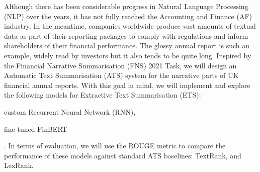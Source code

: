 Although there has been considerable progress in Natural Language Processing (NLP) over the years, it has not fully reached the Accounting and Finance (AF) industry.
In the meantime, companies worldwide produce vast amounts of textual data as part of their reporting packages to comply with regulations and inform shareholders of their financial performance.
The glossy annual report is such an example, widely read by investors but it also tends to be quite long.
Inspired by the Financial Narrative Summarisation (FNS) 2021 Task, we will design an Automatic Text Summarisation (ATS) system for the narrative parts of UK financial annual reports.
With this goal in mind, we will implement and explore the following models for Extractive Text Summarisation (ETS):
\begin{enumerate*} \item custom Recurrent Neural Network (RNN), \item fine-tuned FinBERT \end{enumerate*}.
In terms of evaluation, we will use the ROUGE metric to compare the performance of these models against standard ATS baselines: TextRank, and LexRank.